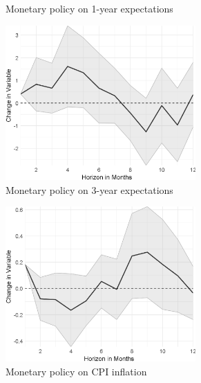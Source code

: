 \begin{figure}
\begin{subfigure}{00.24\textwidth}
		\caption{Monetary policy on 1-year expectations}
	\end{subfigure}
	\begin{subfigure}{00.24\textwidth}
		\includegraphics[width=0.8\textwidth]{output/lp/baseline/bHP/monetary_policy/monetary_policyonexpectations3y_djn.eps}
		\caption{Monetary policy on 3-year expectations}
	\end{subfigure}
	\begin{subfigure}{00.24\textwidth}
		\includegraphics[width=0.8\textwidth]{output/lp/baseline/bHP/monetary_policy/monetary_policyoninflation_djn.eps}
		\caption{Monetary policy on CPI inflation}
	\end{subfigure}
	\begin{subfigure}{00.24\textwidth}

\end{subfigure}
\end{figure}
